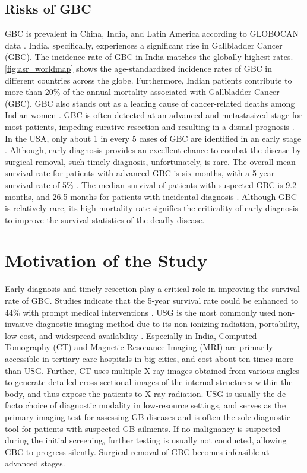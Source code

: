 \subsection{Risks of GBC} 
GBC is prevalent in China, India, and Latin America according to GLOBOCAN data \cite{bray2018global}. India, specifically, experiences a significant rise in Gallbladder Cancer (GBC). The incidence rate of GBC in India matches the globally highest rates. \cref{fig:asr_worldmap} shows the age-standardized incidence rates of GBC in different countries across the globe.
Furthermore, Indian patients contribute to more than 20\% of the annual mortality associated with Gallbladder Cancer (GBC). GBC also stands out as a leading cause of cancer-related deaths among Indian women \cite{randi2006gallbladder}. GBC is often detected at an advanced and metastasized stage for most patients, impeding curative resection and resulting in a dismal prognosis \cite{gupta2021locally, randi2006gallbladder}. 
In the USA, only about 1 in every 5 cases of GBC are identified in an early stage \cite{howlader2017seer}. Although, early diagnosis provides an excellent chance to combat the disease by surgical removal, such timely diagnosis, unfortunately, is rare. The overall mean survival rate for patients with advanced GBC is six months, with a 5-year survival rate of 5\% \cite{levy2001gallbladder}. The median survival of patients with suspected GBC is 9.2 months, and 26.5 months for patients with incidental diagnosis \cite{wullstein2002complications}. Although GBC is relatively rare, its high mortality rate signifies the criticality of early diagnosis to improve the survival statistics of the deadly disease.  

\section{Motivation of the Study}
%
Early diagnosis and timely resection play a critical role in improving the survival rate of GBC. Studies indicate that the 5-year survival rate could be enhanced to 44\% with prompt medical interventions \cite{chen2016long}. USG is the most commonly used non-invasive diagnostic imaging method due to its non-ionizing radiation, portability, low cost, and widespread availability \cite{klibanov2015ultrasound}. Especially in India, Computed Tomography (CT) and Magnetic Resonance Imaging (MRI) are primarily accessible in tertiary care hospitals in big cities, and cost about ten times more than USG. Further, CT uses multiple X-ray images obtained from various angles to generate detailed cross-sectional images of the internal structures within the body, and thus expose the patients to X-ray radiation. USG is usually the de facto choice of diagnostic modality in low-resource settings, and serves as the primary imaging test for assessing GB diseases and is often the sole diagnostic tool for patients with suspected GB ailments. If no malignancy is suspected during the initial screening, further testing is usually not conducted, allowing GBC to progress silently. Surgical removal of GBC becomes infeasible at advanced stages.

